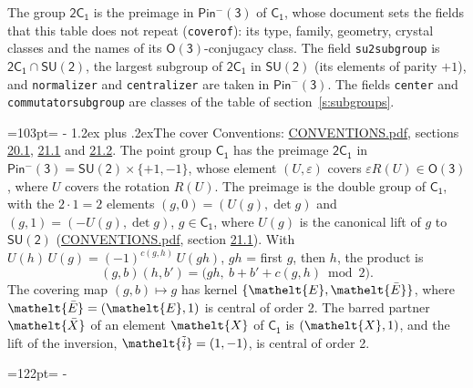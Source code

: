 \documentclass[10pt,a4paper]{article}
\makeatletter
\renewcommand\section{\@startsection{section}{1}{\z@}{-3ex plus -1ex minus -.2ex}%
  {1.2ex plus .2ex}{\normalfont\large\sffamily\bfseries\color{parttitle}}}
\newcommand{\needspace}[1]{\par\penalty-100\begingroup\dimen0=#1\relax\dimen2=\pagegoal
  \advance\dimen2-\pagetotal\ifdim\dimen0>\dimen2\relax\ifdim\dimen2>0pt\vfil\break\fi\fi
  \endgroup}
\numberwithin{equation}{section}
\newcommand{\eltfont}[1]{{\let\sigma\eltsigma\mathelt{#1}}}
\newcommand{\grp}[1]{\mathsf{#1}}
\newcommand{\elt}[1]{\eltfont{#1}}
\newcommand{\dirprod}{\times}
\newcommand{\barred}[1]{\bar{#1}}
\newcommand{\lift}[1]{\tilde{#1}}
\makeatother
\begin{document}
\leavevmode\label{n:element.inversion}\label{n:group.preimage}The group $\grp{2C_{1}}$ is the preimage in $\grp{Pin^{-}(3)}$ of \href{../../../rotation/data/pdf/C1.pdf}{$\grp{C_{1}}$}, whose document sets the fields that this table does not repeat (\texttt{coverof}): its type, family, geometry, crystal classes and the names of its \href{../../../rotation/data/pdf/O3.pdf}{$\grp{O(3)}$}-conjugacy class. The field \texttt{su2subgroup} is $\grp{2C_{1}} \cap \grp{SU(2)}$, the largest subgroup of $\grp{2C_{1}}$ in $\grp{SU(2)}$ (its elements of parity $+1$), and \texttt{normalizer} and \texttt{centralizer} are taken in $\grp{Pin^{-}(3)}$. The fields \texttt{center} and \texttt{commutatorsubgroup} are classes of the table of section~\ref{s:subgroups}.
\needspace{103pt}
\section{The cover}\label{s:cover}
Conventions: \href{../../CONVENTIONS.pdf}{CONVENTIONS.pdf}, sections \href{../../CONVENTIONS.pdf\#conv.20.1}{20.1}, \href{../../CONVENTIONS.pdf\#conv.21.1}{21.1} and \href{../../CONVENTIONS.pdf\#conv.21.2}{21.2}.
\leavevmode\label{n:group.pin.minus}\label{n:group.su2}\label{n:local.pin.sign}\label{n:matrix.covered}\label{n:matrix.lift.su2}\label{n:index.bar}The point group $\grp{C_{1}}$ has the preimage $\grp{2C_{1}}$ in $\grp{Pin^{-}(3)} = \grp{SU(2)} \dirprod \{+1, -1\}$, whose element $(U, \varepsilon)$ covers $\varepsilon R(U) \in \grp{O(3)}$, where $U$ covers the rotation $R(U)$. The preimage is the double group of $\grp{C_{1}}$, with the $2 \cdot 1 = 2$ elements $(g, 0) = (U(g), \det g)$ and $(g, 1) = (-U(g), \det g)$, $g \in \grp{C_{1}}$, where $U(g)$ is the canonical lift of $g$ to $\grp{SU(2)}$ (\href{../../CONVENTIONS.pdf}{CONVENTIONS.pdf}, section \href{../../CONVENTIONS.pdf\#conv.21.1}{21.1}). \label{n:function.cocycle}With $U(h)\,U(g) = (-1)^{c(g,h)}\,U(gh)$, $gh$ = first $g$, then $h$, the product is
\begin{equation}\label{e:product}(g, b)(h, b') = \bigl(gh,\ b + b' + c(g, h) \bmod 2\bigr).\end{equation}
\leavevmode\label{n:mark.bar}The covering map $(g, b) \mapsto g$ has kernel $\{\elt{E}, \elt{\barred{E}}\}$, where $\elt{\barred{E}} = (\elt{E}, 1)$ is central of order 2. \label{n:element.named}\label{n:mark.lift}The barred partner $\elt{\barred{X}}$ of an element $\elt{X}$ of $\grp{C_{1}}$ is $(\elt{X}, 1)$, and the lift of the inversion, $\elt{\lift{i}} = (1, -1)$, is central of order 2.
\needspace{122pt}
\end{document}
